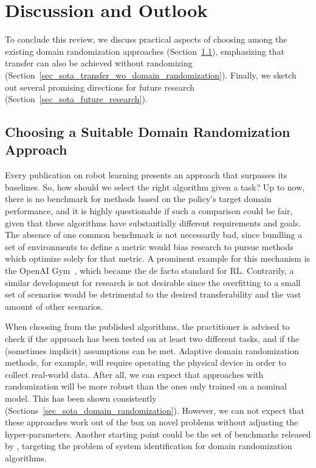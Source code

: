 \documentclass[utf8]{frontiersSCNS} %
\begin{document}
\section{Discussion and Outlook}
\label{sec_sota_discussion_and_outlook}
To conclude this review, we discuss practical aspects of choosing among the existing domain randomization approaches (Section~\ref{sec_sota_expectation_management}), emphasizing that \simtoreal transfer can also be achieved without randomizing (Section~\ref{sec_sota_transfer_wo_domain_randomization}).
Finally, we sketch out several promising directions for future \simtoreal research (Section~\ref{sec_sota_future_research}).

\subsection{Choosing a Suitable Domain Randomization Approach}
\label{sec_sota_expectation_management}
Every publication on \simtoreal robot learning presents an approach that surpasses its baselines.
So, how should we select the right algorithm given a task?
Up to now, there is no benchmark for \simtoreal methods based on the policy's target domain performance, and it is highly questionable if such a comparison could be fair, given that these algorithms have substantially different requirements and goals.
The absence of one common benchmark is not necessarily bad, since bundling a set of environments to define a metric would bias research to pursue methods which optimize solely for that metric.
A prominent example for this mechanism is the OpenAI Gym~\citep{Brockman_Zaremba_16}, which became the de facto standard for \ac{RL}. 
Contrarily, a similar development for \simtoreal research is not desirable since the overfitting to a small set of scenarios would be detrimental to the desired transferability and the vast amount of other scenarios.

When choosing from the published algorithms, the practitioner is advised to check if the approach has been tested on at least two different \simtoreal tasks, and if the (sometimes implicit) assumptions can be met.
Adaptive domain randomization methods, for example, will require operating the physical device in order to collect real-world data.
After all, we can expect that approaches with randomization will be more robust than the ones only trained on a nominal model.
This has been shown consistently (Sections~\ref{sec_sota_domain_randomization}).
However, we can not expect that these approaches work out of the box on novel problems without adjusting the hyper-parameters.
Another starting point could be the set of \simtosim benchmarks released by \citet{Mehta_Ramos_20}, targeting the problem of system identification for \sota domain randomization algorithms.
\end{document}
